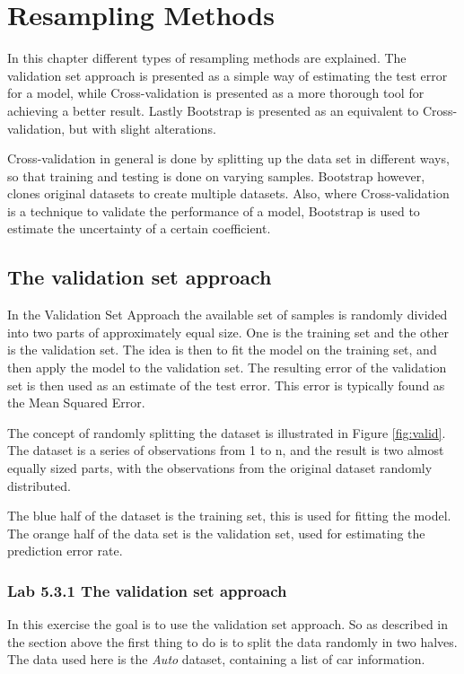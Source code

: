 \chapter{Resampling Methods}
\label{chp:crossvalidation}
In this chapter different types of resampling methods are explained. The validation set approach is presented as a simple way of estimating the test error for a model, while Cross-validation is presented as a more thorough tool for achieving a better result. Lastly Bootstrap is presented as an equivalent to Cross-validation, but with slight alterations. 

Cross-validation in general is done by splitting up the data set in different ways, so that training and testing is done on varying samples. Bootstrap however, clones original datasets to create multiple datasets. Also, where Cross-validation is a technique to validate the performance of a model, Bootstrap is used to estimate the uncertainty of a certain coefficient. 

\section{The validation set approach}
\label{sec:VSA}
In the Validation Set Approach the available set of samples is randomly divided into two parts of approximately equal size. One is the training set and the other is the validation set. The idea is then to fit the model on the training set, and then apply the model to the validation set. The resulting error of the validation set is then used as an estimate of the test error. This error is typically found as the Mean Squared Error. 


The concept of randomly splitting the dataset is illustrated in Figure \ref{fig:valid}. The dataset is a series of observations from 1 to n, and the result is two almost equally sized parts, with the observations from the original dataset randomly distributed. 

The blue half of the dataset is the training set, this is used for fitting the model. The orange half of the data set is the validation set, used for estimating the prediction error rate.


\subsection{Lab 5.3.1 The validation set approach}
In this exercise the goal is to use the validation set approach. So as described in the section above the first thing to do is to split the data randomly in two halves. The data used here is the \emph{Auto} dataset, containing a list of car information. 

